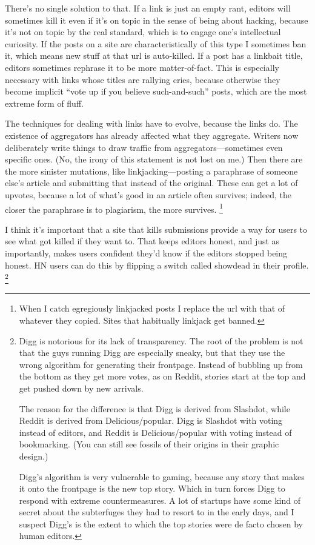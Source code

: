 There's no single solution to that. If a link is just an empty rant,
editors will sometimes kill it even if it's on topic in the sense of
being about hacking, because it's not on topic by the real standard,
which is to engage one's intellectual curiosity. If the posts on a site
are characteristically of this type I sometimes ban it, which means new
stuff at that url is auto-killed. If a post has a linkbait title,
editors sometimes rephrase it to be more matter-of-fact. This is
especially necessary with links whose titles are rallying cries, because
otherwise they become implicit ``vote up if you believe such-and-such''
posts, which are the most extreme form of fluff.

The techniques for dealing with links have to evolve, because the links
do. The existence of aggregators has already affected what they
aggregate. Writers now deliberately write things to draw traffic from
aggregators---sometimes even specific ones. (No, the irony of this
statement is not lost on me.) Then there are the more sinister
mutations, like linkjacking---posting a paraphrase of someone else's
article and submitting that instead of the original. These can get a lot
of upvotes, because a lot of what's good in an article often survives;
indeed, the closer the paraphrase is to plagiarism, the more survives.
\footnote{When I catch egregiously linkjacked posts I replace the url with
that of whatever they copied. Sites that habitually linkjack get banned.}

I think it's important that a site that kills submissions provide a way
for users to see what got killed if they want to. That keeps editors
honest, and just as importantly, makes users confident they'd know if
the editors stopped being honest. HN users can do this by flipping a
switch called showdead in their profile. \footnote{Digg is notorious for its lack of transparency. The root of the
problem is not that the guys running Digg are especially sneaky, but
that they use the wrong algorithm for generating their frontpage.
Instead of bubbling up from the bottom as they get more votes, as on
Reddit, stories start at the top and get pushed down by new arrivals.

The reason for the difference is that Digg is derived from Slashdot,
while Reddit is derived from Delicious/popular. Digg is Slashdot with
voting instead of editors, and Reddit is Delicious/popular with voting
instead of bookmarking. (You can still see fossils of their origins in
their graphic design.)

Digg's algorithm is very vulnerable to gaming, because any story that
makes it onto the frontpage is the new top story. Which in turn forces
Digg to respond with extreme countermeasures. A lot of startups have
some kind of secret about the subterfuges they had to resort to in the
early days, and I suspect Digg's is the extent to which the top stories
were de facto chosen by human editors.}

